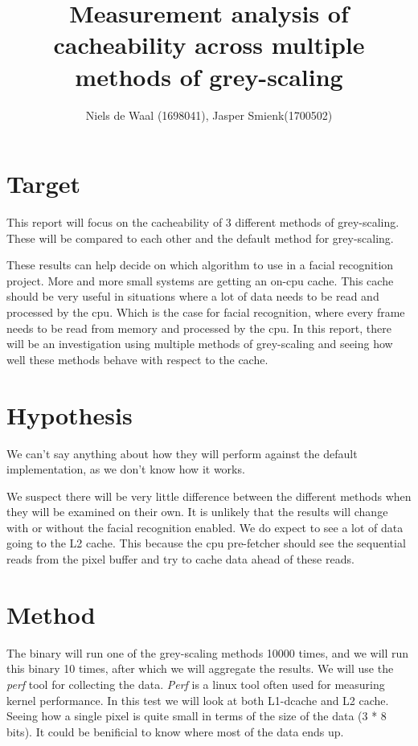 \documentclass[a4paper]{article}
\begin{document}
\title{Measurement analysis of cacheability across multiple methods of grey-scaling}
\author{Niels de Waal (1698041), Jasper Smienk(1700502)}
\maketitle
\newpage

\tableofcontents
\newpage

\section{Target}
This report will focus on the cacheability of 3 different methods of grey-scaling. These will be compared to each other and the default method for grey-scaling.

These results can help decide on which algorithm to use in a facial recognition project. More and more small systems are getting an on-cpu cache. This cache should be very useful in situations where a lot of data needs to be read and processed by the cpu. Which is the case for facial recognition, where every frame needs to be read from memory and processed by the cpu. In this report, there will be an investigation using multiple methods of grey-scaling and seeing how well these methods behave with respect to the cache.

\section{Hypothesis}
We can't say anything about how they will perform against the default implementation, as we don't know how it works.

We suspect there will be very little difference between the different methods when they will be examined on their own. It is unlikely that the results will change with or without the facial recognition enabled. We do expect to see a lot of data going to the L2 cache. This because the cpu pre-fetcher should see the sequential reads from the pixel buffer and try to cache data ahead of these reads.

\section{Method}
The binary will run one of the grey-scaling methods 10000 times, and we will run this binary 10 times, after which we will aggregate the results. We will use the \textit{perf} tool for collecting the data. \textit{Perf} is a linux tool often used for measuring kernel performance. In this test we will look at both L1-dcache and L2 cache. Seeing how a single pixel is quite small in terms of the size of the data (3 * 8 bits). It could be benificial to know where most of the data ends up.
\end{document}
